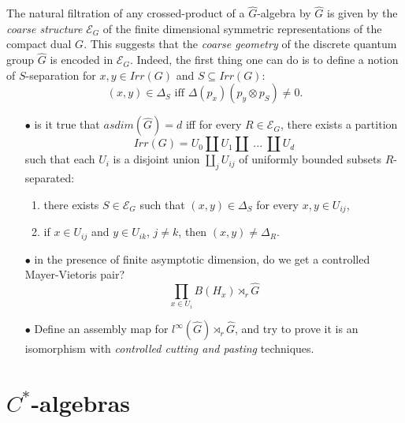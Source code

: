 The natural filtration of any crossed-product of a $\hat G$-algebra by $\hat G$ is given by the \textit{coarse structure} $\mathcal E_G$ of the finite dimensional symmetric representations of the compact dual $G$. This suggests that the \textit{coarse geometry} of the discrete quantum group $\hat G$ is encoded in $\mathcal E_G$. Indeed, the first thing one can do is to define a notion of $S$-separation for $x,y\in Irr(G)$ and $S\subseteq Irr(G)$:
\[(x,y )\in \Delta_S  \text{ iff } \Delta(p_x) (p_y \otimes p_S)\neq 0.\] 

\begin{itemize}
\item[$\bullet$] is it true that $asdim(\hat G)=d$ iff for every $R\in \mathcal E_G$, there exists a partition
\[Irr(G) = U_0 \coprod U_1 \coprod \ ... \ \coprod U_d\]
such that each $U_i$ is a disjoint union $\coprod_j U_{ij}$ of uniformly bounded subsets $R$-separated:
\begin{enumerate}
\item there exists $S\in \mathcal E_G$ such that $(x,y)\in \Delta_S$ for every $x,y \in U_{ij}$,
\item if $x\in U_{ij}$ and $y\in U_{ik}$, $j\neq k$, then $(x,y)\neq \Delta_R$.\\
\end{enumerate}

\item[$\bullet$] in the presence of finite asymptotic dimension, do we get a controlled Mayer-Vietoris pair? 
\[ \prod_{x\in U_i} B(H_x) \rtimes_r \hat G\]

\item[$\bullet$] Define an assembly map for $l^\infty(\hat G)\rtimes_r \hat G$, and try to prove it is an isomorphism with \textit{controlled cutting and pasting} techniques.
\end{itemize}

\newpage
\section{$C^*$-algebras}

